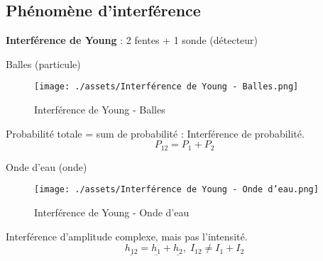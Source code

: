 \subsection{Phénomène d'interférence}
\textbf{Interférence de Young} : 2 fentes + 1 sonde (détecteur)
\begin{Prop}{Balles (particule)}{}
                \begin{figure}[H] %
                    \centering
                    \texttt{[image: ./assets/Interférence de Young - Balles.png]}
                    \caption{Interférence de Young - Balles}
                    \label{fig:Interfe-rence-de-Young-Balles}
                \end{figure}

                Probabilité totale = sum de probabilité : Interférence de probabilité.
                \[
                    P_{12} = P_1 + P_2
                \]
\end{Prop}

\begin{Prop}{Onde d'eau (onde)}{}
                \begin{figure}[H] %
                    \centering
                    \texttt{[image: ./assets/Interférence de Young - Onde d'eau.png]}
                    \caption{Interférence de Young - Onde d'eau}
                    \label{fig:Interfe-rence-de-Young-Onde-d-eau}
                \end{figure}
                
                Interférence d'amplitude complexe, mais pas l'intensité.
                \[
                    \underline{h_{12}} = \underline{h_1} + \underline{h_2},\; I_{12} \ne I_1 + I_2
                \]
\end{Prop}

